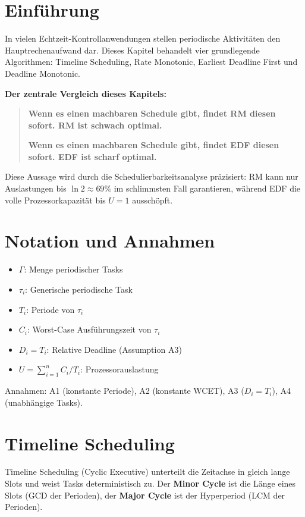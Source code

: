 ﻿\documentclass[a4paper,12pt]{report}
\theoremstyle{definition}
\begin{document}
\section{Einführung}

In vielen Echtzeit-Kontrollanwendungen stellen periodische Aktivitäten den
Hauptrechenaufwand dar. Dieses Kapitel behandelt vier grundlegende Algorithmen:
Timeline Scheduling, Rate Monotonic, Earliest Deadline First und Deadline Monotonic.

\textbf{Der zentrale Vergleich dieses Kapitels:}

\begin{quote}
\textbf{Wenn es einen machbaren Schedule gibt, findet RM diesen sofort. RM ist schwach optimal.}

\textbf{Wenn es einen machbaren Schedule gibt, findet EDF diesen sofort. EDF ist scharf optimal.}
\end{quote}

Diese Aussage wird durch die Schedulierbarkeitsanalyse präzisiert: RM kann nur
Auslastungen bis $\ln 2 \approx 69\%$ im schlimmsten Fall garantieren, während
EDF die volle Prozessorkapazität bis $U = 1$ ausschöpft.

\section{Notation und Annahmen}

\begin{itemize}
	\item $\Gamma$: Menge periodischer Tasks
	\item $\tau_i$: Generische periodische Task
	\item $T_i$: Periode von $\tau_i$
	\item $C_i$: Worst-Case Ausführungszeit von $\tau_i$
	\item $D_i = T_i$: Relative Deadline (Assumption A3)
	\item $U = \sum_{i=1}^{n} C_i/T_i$: Prozessorauslastung
\end{itemize}

Annahmen: A1 (konstante Periode), A2 (konstante WCET), A3 ($D_i = T_i$),
A4 (unabhängige Tasks).

\section{Timeline Scheduling}

Timeline Scheduling (Cyclic Executive) unterteilt die Zeitachse in gleich
lange Slots und weist Tasks deterministisch zu. Der \textbf{Minor Cycle} ist die
Länge eines Slots (GCD der Perioden), der \textbf{Major Cycle} ist der
Hyperperiod (LCM der Perioden).
\end{document}
